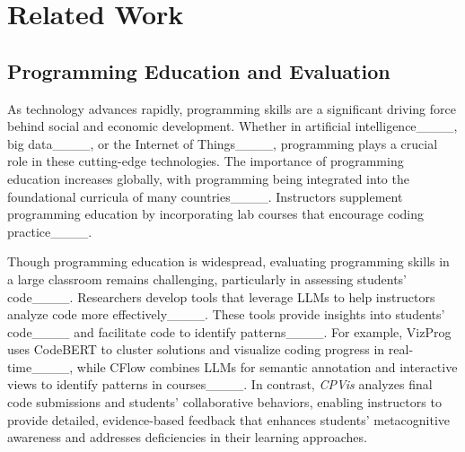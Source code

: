 \section{Related Work}
\label{sec:related}

\subsection{Programming Education and Evaluation}
As technology advances rapidly, programming skills are a significant driving force behind social and economic development. 
Whether in artificial intelligence____, big data____, or the Internet of Things____, programming plays a crucial role in these cutting-edge technologies.
The importance of programming education increases globally, with programming being integrated into the foundational curricula of many countries____. 
Instructors supplement programming education by incorporating lab courses that encourage coding practice____. 

Though programming education is widespread, evaluating programming skills in a large classroom remains challenging, particularly in assessing students' code____. 
Researchers develop tools that leverage LLMs to help instructors analyze code more effectively____. 
These tools provide insights into students' code____ and facilitate code to identify patterns____. 
For example, VizProg uses CodeBERT to cluster solutions and visualize coding progress in real-time____, while CFlow combines LLMs for semantic annotation and interactive views to identify patterns in courses____. 
In contrast, \textit{CPVis} analyzes final code submissions and students' collaborative behaviors, enabling instructors to provide detailed, evidence-based feedback that enhances students' metacognitive awareness and addresses deficiencies in their learning approaches.

